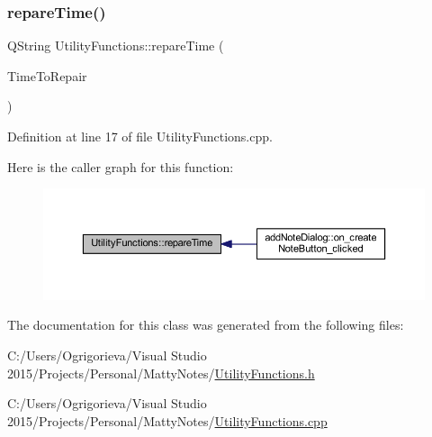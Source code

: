 \subsubsection{\texorpdfstring{repare\+Time()}{repareTime()}}
{\footnotesize\ttfamily Q\+String Utility\+Functions\+::repare\+Time (\begin{DoxyParamCaption}\item[{Q\+String}]{Time\+To\+Repair }\end{DoxyParamCaption})\hspace{0.3cm}{\ttfamily [static]}}



Definition at line 17 of file Utility\+Functions.\+cpp.

Here is the caller graph for this function\+:
\nopagebreak
\begin{figure}[H]
\begin{center}
\leavevmode
\includegraphics[width=350pt]{classUtilityFunctions_ac2212f463b34781025e9e0bcfeaad3eb_icgraph}
\end{center}
\end{figure}


The documentation for this class was generated from the following files\+:\begin{DoxyCompactItemize}
\item 
C\+:/\+Users/\+Ogrigorieva/\+Visual Studio 2015/\+Projects/\+Personal/\+Matty\+Notes/\hyperlink{UtilityFunctions_8h}{Utility\+Functions.\+h}\item 
C\+:/\+Users/\+Ogrigorieva/\+Visual Studio 2015/\+Projects/\+Personal/\+Matty\+Notes/\hyperlink{UtilityFunctions_8cpp}{Utility\+Functions.\+cpp}\end{DoxyCompactItemize}
